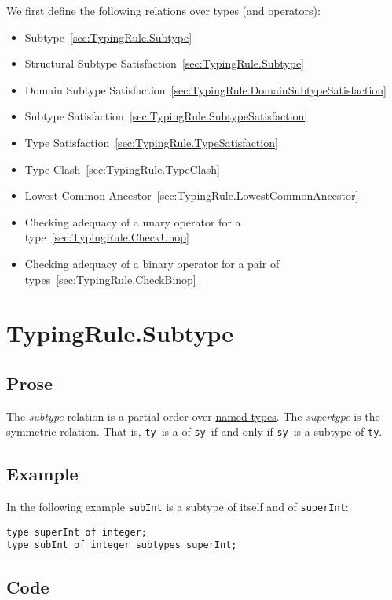 \documentclass{book}
\newcommand\tty[0]{\texttt{ty}}
\newcommand\tsy[0]{\texttt{sy}}
\begin{document}
We first define the following relations over types (and operators):
\begin{itemize}
  \item Subtype~\ref{sec:TypingRule.Subtype}
  \item Structural Subtype Satisfaction~\ref{sec:TypingRule.Subtype}
  \item Domain Subtype Satisfaction~\ref{sec:TypingRule.DomainSubtypeSatisfaction}
  \item Subtype Satisfaction~\ref{sec:TypingRule.SubtypeSatisfaction}
  \item Type Satisfaction~\ref{sec:TypingRule.TypeSatisfaction}
  \item Type Clash~\ref{sec:TypingRule.TypeClash}
  \item Lowest Common Ancestor~\ref{sec:TypingRule.LowestCommonAncestor}
  \item Checking adequacy of a unary operator for a type~\ref{sec:TypingRule.CheckUnop}
  \item Checking adequacy of a binary operator for a pair of types~\ref{sec:TypingRule.CheckBinop}
\end{itemize}

\section{TypingRule.Subtype\label{sec:TypingRule.Subtype}}

  \subsection{Prose}
The \emph{subtype} relation is a partial order over \underline{named types}.
The \emph{supertype} is the symmetric relation. That is, \tty\ is a  of \tsy\ if and only if \tsy\ is a subtype of \tty.

  \subsection{Example}
In the following example \texttt{subInt} is a subtype of itself and of \texttt{superInt}:
\begin{verbatim}
type superInt of integer;
type subInt of integer subtypes superInt;
\end{verbatim}

  \subsection{Code}
\end{document}

